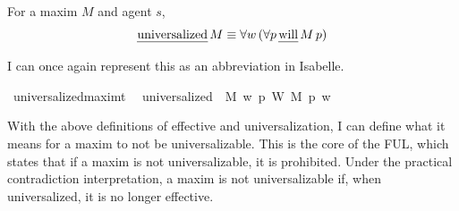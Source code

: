 \begin{isabellebody}
\begin{isamarkuptext}
\begin{definition}[Universalized]
  For a maxim $M$ and agent $s$,
$$\text{\emph{universalized}} \, M  \equiv \forall w \, (\forall p \, \text{\emph{will}} \, M \, p)$$
\end{definition}

I can once again represent this as an abbreviation in Isabelle.%
\end{isamarkuptext}\isamarkuptrue%
\isamarkupfalse%
\ universalized{\isacharcolon}{\isacharcolon}{\isachardoublequoteopen}maxim{\isasymRightarrow}t{\isachardoublequoteclose}\ \ \isanewline
{\isachardoublequoteopen}universalized\ {\isasymequiv}\ {\isasymlambda}M{\isachardot}\ {\isacharparenleft}{\isasymlambda}w{\isachardot}\ {\isacharparenleft}{\isasymforall}p{\isachardot}\ {\isacharparenleft}W\ M\ p{\isacharparenright}\ w{\isacharparenright}{\isacharparenright}{\isachardoublequoteclose}\isanewline
%
\isanewline
%
\begin{isamarkuptext}%
With the above definitions of effective and universalization, I can define what it means for 
a maxim to not be universalizable. This is the core of the FUL, which states that if a maxim is not 
universalizable, it is prohibited. Under the practical contradiction interpretation, a maxim is 
not universalizable if, when universalized, it is no longer effective.


\end{isamarkuptext}
\end{isabellebody}
